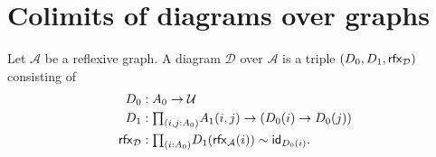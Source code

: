 \begin{comment}
\begin{thm}
Let $\mathcal{B}$ be a family of reflexive graphs over $\mathcal{A}$. The following are equivalent:
\begin{enumerate}
\item $\mathcal{B}$ is diagrammatic.
\item The morphism $\proj 1 : \mathsf{rGph}(\msm{\mathcal{A}}{\mathcal{B}},\mathcal{A})$ is a left fibration.
\item The morphism $\proj 1 : \mathsf{rGph}(\msm{\mathcal{A}}{\mathcal{B}},\mathcal{A})$ is left cartesian.
\end{enumerate}
\end{thm}

\begin{thm}\label{thm:fib_cart}
Let $\mathcal{B}$ be a family of reflexive graphs over $\mathcal{A}$. The following are equivalent:
\begin{enumerate}
\item $A$ is equifibered.
\item The morphism $\proj 1 : \mathsf{rGph}(\msm{\mathcal{A}}{\mathcal{B}},\mathcal{A})$ is a fibration.
\item The morphism $\proj 1 : \mathsf{rGph}(\msm{\mathcal{A}}{\mathcal{B}},\mathcal{A})$ is cartesian.
\end{enumerate}
\end{thm}
\end{comment}

\section{Colimits of diagrams over graphs}

\begin{defn}
Let $\mathcal{A}$ be a reflexive graph. A diagram $\mathcal{D}$ over $\mathcal{A}$ is a triple $(\pts{D},\edg{D},\rfx{\mathcal{D}})$ consisting of
\begin{align*}
\pts{D} & : \pts{A}\to \UU \\
\edg{D} & : \prd{i,j:\pts{A}} \edg{A}(i,j)\to (\pts{D}(i)\to \pts{D}(j)) \\
\rfx{\mathcal{D}} & : \prd{i:\pts{A}} \edg{D}(\rfx{\mathcal{A}}(i))\htpy \idfunc[\pts{D}(i)].
\end{align*}
\end{defn}

